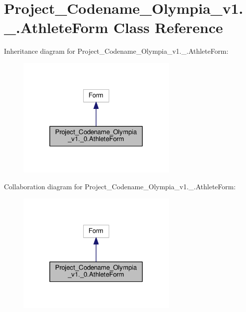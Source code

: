 \hypertarget{classProject__Codename__Olympia__v1_1_1__0_1_1AthleteForm}{}\section{Project\+\_\+\+Codename\+\_\+\+Olympia\+\_\+v1.\+\_.\+Athlete\+Form Class Reference}
\label{classProject__Codename__Olympia__v1_1_1__0_1_1AthleteForm}


Inheritance diagram for Project\+\_\+\+Codename\+\_\+\+Olympia\+\_\+v1.\+\_.\+Athlete\+Form\+:
\nopagebreak
\begin{figure}[H]
\begin{center}
\leavevmode
\includegraphics[width=221pt]{classProject__Codename__Olympia__v1_1_1__0_1_1AthleteForm__inherit__graph}
\end{center}
\end{figure}


Collaboration diagram for Project\+\_\+\+Codename\+\_\+\+Olympia\+\_\+v1.\+\_.\+Athlete\+Form\+:
\nopagebreak
\begin{figure}[H]
\begin{center}
\leavevmode
\includegraphics[width=221pt]{classProject__Codename__Olympia__v1_1_1__0_1_1AthleteForm__coll__graph}
\end{center}
\end{figure}
